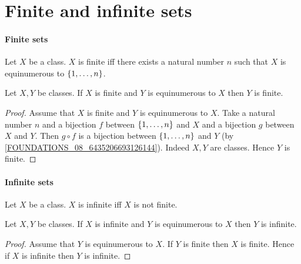 \documentclass[../arithmetic.tex]{subfiles}
\begin{document}
  \section{Finite and infinite sets}

  \paragraph{Finite sets}

  \begin{forthel}
    \begin{definition}
      Let $X$ be a class.
      $X$ is finite iff there exists a natural number $n$ such that $X$ is
      equinumerous to $\{1,\dots,n\}$.
    \end{definition}
  \end{forthel}

  \begin{forthel}
    \begin{proposition}
      Let $X, Y$ be classes.
      If $X$ is finite and $Y$ is equinumerous to $X$ then $Y$ is finite.
    \end{proposition}
    \begin{proof}
      Assume that $X$ is finite and $Y$ is equinumerous to $X$.
      Take a natural number $n$ and a bijection $f$ between $\{1,\dots,n\}$
      and $X$ and a bijection $g$ between $X$ and $Y$.
      Then $g \circ f$ is a bijection between $\{1,\dots,n\}$ and $Y$
      (by \cref{FOUNDATIONS_08_6435206693126144}).
      Indeed $X, Y$ are classes.
      Hence $Y$ is finite.
    \end{proof}
  \end{forthel}


  \paragraph{Infinite sets}

  \begin{forthel}
    \begin{definition}
      Let $X$ be a class.
      $X$ is infinite iff $X$ is not finite.
    \end{definition}
  \end{forthel}

  \begin{forthel}
    \begin{proposition}
      Let $X, Y$ be classes.
      If $X$ is infinite and $Y$ is equinumerous to $X$ then $Y$ is infinite.
    \end{proposition}
    \begin{proof}
      Assume that $Y$ is equinumerous to $X$.
      If $Y$ is finite then $X$ is finite.
      Hence if $X$ is infinite then $Y$ is infinite.
    \end{proof}
  \end{forthel}
\end{document}
